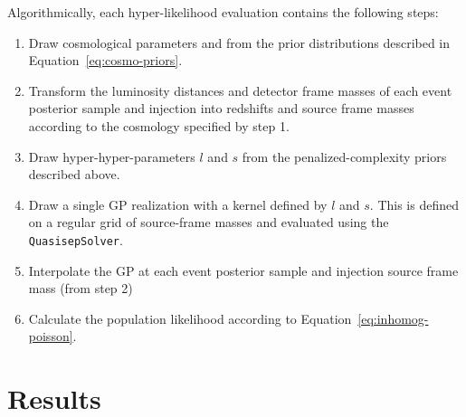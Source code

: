 \documentclass[]{aastex631}
\begin{document}
Algorithmically, each hyper-likelihood evaluation contains the following steps:
\begin{enumerate}
    \item Draw cosmological parameters \Ho{} and \Omm{} from the prior distributions described in Equation~\ref{eq:cosmo-priors}.
    \item Transform the luminosity distances and detector frame masses of each event posterior sample and injection into redshifts and source frame masses according to the cosmology specified by step 1.
    \item Draw hyper-hyper-parameters $l$ and $s$ from the penalized-complexity priors described above.
    \item Draw a single GP realization with a kernel defined by $l$ and $s$. This is defined on a regular grid of source-frame masses and evaluated using the \texttt{QuasisepSolver}.
    \item Interpolate the GP at each event posterior sample and injection source frame mass (from step 2)
    \item Calculate the population likelihood according to Equation~\ref{eq:inhomog-poisson}.
\end{enumerate}



\section{Results}
\label{sec:results}
\end{document}
